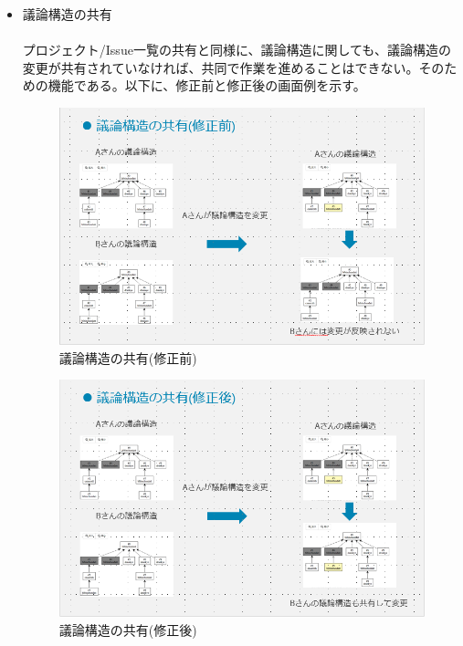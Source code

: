 \documentclass[12pt, oneside]{jreport}
\begin{document}
\begin{itemize}
		
			\item 議論構造の共有
			\\ \\
			プロジェクト/Issue一覧の共有と同様に、議論構造に関しても、議論構造の変更が共有されていなければ、共同で作業を進めることはできない。そのための機能である。以下に、修正前と修正後の画面例を示す。
			
			\begin{figure}[H]
			\centering
			\includegraphics[width=17cm,bb=200 300 -200 27]{graphedit_before.PNG}
			\caption{議論構造の共有(修正前)}
			\end{figure}
						\begin{figure}[H]
			\centering
			\includegraphics[width=17cm,bb=200 300 -200 27]{graphedit_after.PNG}
			\caption{議論構造の共有(修正後)}
			\end{figure}
			
		\end{itemize}
		
\end{document}
